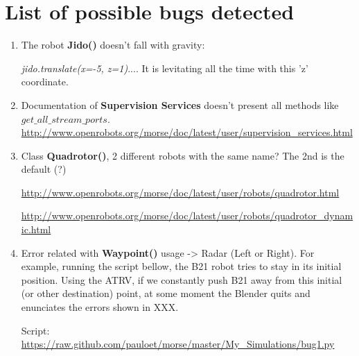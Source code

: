 \chapter*{List of possible bugs detected}

\begin{enumerate}
\item The robot \textbf{Jido()} doesn't fall with gravity:

\textit{jido.translate(x=-5, z=1)}.... It is levitating all the time with this 'z' coordinate.

\item Documentation of \textbf{Supervision Services} doesn't present all methods like \textit{$get\_all\_stream\_ports$}.
\url{http://www.openrobots.org/morse/doc/latest/user/supervision_services.html}

\item Class \textbf{Quadrotor()}, 2 different robots with the same name? The 2nd is the default (?)

\url{http://www.openrobots.org/morse/doc/latest/user/robots/quadrotor.html}

\url{http://www.openrobots.org/morse/doc/latest/user/robots/quadrotor_dynamic.html}

\item Error related with \textbf{Waypoint()} usage -> Radar (Left or Right). For example, running the script bellow, the B21 robot tries to stay in its initial position. Using the ATRV, if we constantly push B21 away from this initial (or other destination) point, at some moment the Blender quits and enunciates the errors shown in XXX.

Script: \url{https://raw.github.com/pauloet/morse/master/My_Simulations/bug1.py}



\end{enumerate}

